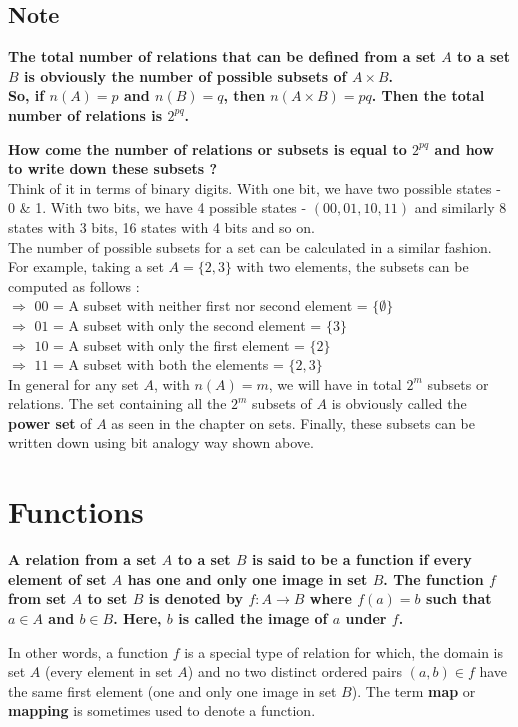 \documentclass[12pt, letterpaper]{article}
\begin{document}
\subsection{Note}
\begin{displayquote}
\textbf{The total number of relations that can be defined from a set $A$ to a set $B$ is obviously the number of possible subsets of $A \times B$.\\
So, if $n(A) = p$ and $n(B) = q$, then $n(A \times B) = pq$. Then the total number of relations is $2^{pq}$.}
\end{displayquote}
\textbf{How come the number of relations or subsets is equal to $2^{pq}$ and how to write down these subsets ?}\\
Think of it in terms of binary digits. With one bit, we have two possible states - 0 \& 1. With two bits, we have 4 possible states - $(00,01,10,11)$ and similarly 8 states with 3 bits, 16 states with 4 bits and so on.\\
The number of possible subsets for a set can be calculated in a similar fashion. For example, taking a set $A = \{2,3\}$ with two elements, the subsets can be computed as follows : \\
$\Rightarrow$ $00$ = A subset with neither first nor second element = $\{\emptyset\}$\\
$\Rightarrow$ $01$ = A subset with only the second element = $\{3\}$\\
$\Rightarrow$ $10$ = A subset with only the first element = $\{2\}$\\
$\Rightarrow$ $11$ = A subset with both the elements = $\{2,3\}$\\
In general for any set $A$, with $n(A) = m$, we will have in total $2^m$ subsets or relations. The set containing all the $2^m$ subsets of $A$ is obviously called the \textbf{power set} of $A$ as seen in the chapter on sets. Finally, these subsets can be written down using bit analogy way shown above.

\section{Functions}
\begin{displayquote}
\textbf{A relation from a set $A$ to a set $B$ is said to be a function if every element of set $A$ has one and only one image in set $B$. The function $f$ from set $A$ to set $B$ is denoted by $f : A \rightarrow B$ where $f(a) = b$ such that $a \in A$ and $b \in B$. Here, $b$ is called the image of $a$ under $f$.}
\end{displayquote}
In other words, a function $f$ is a special type of relation for which, the domain is set $A$ (every element in set $A$) and no two distinct ordered pairs $(a,b) \in f$ have the same first element (one and only one image in set $B$). The term \textbf{map} or \textbf{mapping} is sometimes used to denote a function.
\end{document}

